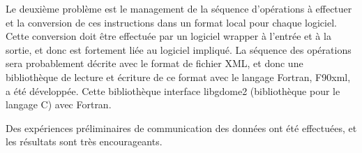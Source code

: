Le deuxi\`eme probl\`eme est le management de la s\'equence d'op\'erations
\`a effectuer et la conversion de ces instructions dans un format local pour
chaque logiciel. Cette conversion doit \^etre effectu\'ee par un logiciel wrapper
\`a l'entr\'ee et \`a la sortie, et donc est fortement li\'ee au logiciel
impliqu\'e.
La s\'equence des op\'erations sera probablement d\'ecrite avec le format
de fichier XML, et donc une biblioth\`eque de lecture et \'ecriture de ce
format avec le langage Fortran, F90xml, a \'et\'e d\'evelopp\'ee. Cette
biblioth\`eque interface libgdome2 (biblioth\`eque pour le langage C) avec
Fortran. 

Des exp\'eriences pr\'eliminaires de communication des donn\'ees ont \'et\'e
effectu\'ees, et les r\'esultats sont tr\`es encourageants.


